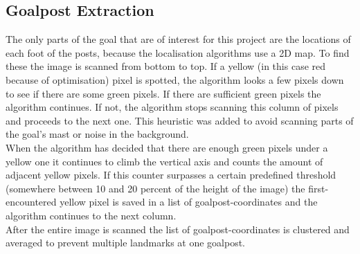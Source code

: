 \documentclass{ba-kecs}
\numberwithin{figure}{section}
\numberwithin{equation}{section}
\begin{document}
\subsection{Goalpost Extraction}
The only parts of the goal that are of interest for this project are the locations of each foot of the posts, because the localisation algorithms use a 2D map. To find these the image is scanned from bottom to top. If a yellow (in this case red because of optimisation) pixel is spotted, the algorithm looks {\color[rgb]{1,0,0}a few pixels down} to see if there are some green pixels. If there are {\color[rgb]{1,0,0}sufficient} green pixels the algorithm continues. If not, the algorithm stops scanning this {\color[rgb]{1,0,0}column of pixels} and proceeds to the next one. This heuristic was added to avoid scanning parts of the goal's mast or noise in the background.\\
When the algorithm has decided that there are enough green pixels under a yellow one it continues to climb the vertical axis and counts the amount of adjacent yellow pixels. If this counter surpasses a certain predefined threshold (somewhere between 10 and 20 percent of the height of the image) the first-encountered yellow pixel is saved in a list of goalpost-coordinates and the algorithm continues to the next column.\\
After the entire image is scanned the list of goalpost-coordinates is clustered and averaged to prevent multiple landmarks at one goalpost.
\end{document}
